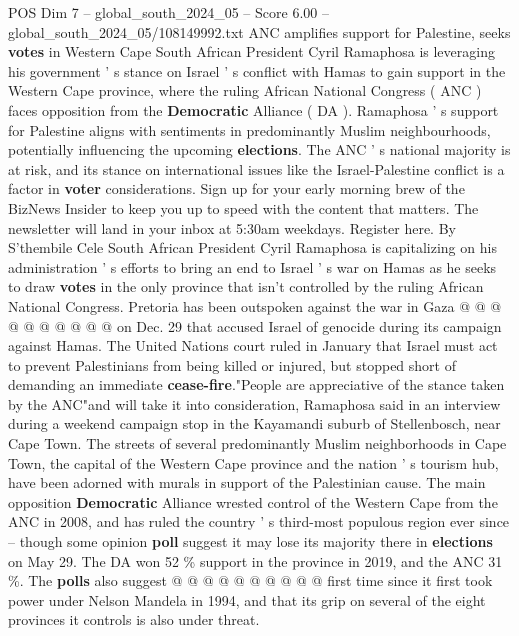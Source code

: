 \begin{textsample}{POS Dim 7 – global\_south\_2024\_05 – Score 6.00 – global\_south\_2024\_05/108149992.txt}  \label{ex:f7_pos_213}
ANC amplifies support for Palestine, seeks \textbf{votes} in Western Cape South African President Cyril Ramaphosa is leveraging his government ' s stance on Israel ' s conflict with Hamas to gain support in the Western Cape province, where the ruling African National Congress ( ANC ) faces opposition from the \textbf{Democratic} Alliance ( DA ).
Ramaphosa ' s support for Palestine aligns with sentiments in predominantly Muslim neighbourhoods, potentially influencing the upcoming \textbf{elections}.
The ANC ' s national majority is at risk, and its stance on international issues like the Israel-Palestine conflict is a factor in \textbf{voter} considerations.
Sign up for your early morning brew of the BizNews Insider to keep you up to speed with the content that matters.
The newsletter will land in your inbox at 5:30am weekdays.
Register here.
By S'thembile Cele South African President Cyril Ramaphosa is capitalizing on his administration ' s efforts to bring an end to Israel ' s war on Hamas as he seeks to draw \textbf{votes} in the only province that isn't controlled by the ruling African National Congress.
Pretoria has been outspoken against the war in Gaza @ @ @ @ @ @ @ @ @ @ on Dec. 29 that accused Israel of genocide during its campaign against Hamas.
The United Nations court ruled in January that Israel must act to prevent Palestinians from being killed or injured, but stopped short of demanding an immediate \textbf{cease-fire}."People are appreciative of the stance taken by the ANC"and will take it into consideration, Ramaphosa said in an interview during a weekend campaign stop in the Kayamandi suburb of Stellenbosch, near Cape Town.
The streets of several predominantly Muslim neighborhoods in Cape Town, the capital of the Western Cape province and the nation ' s tourism hub, have been adorned with murals in support of the Palestinian cause.
The main opposition \textbf{Democratic} Alliance wrested control of the Western Cape from the ANC in 2008, and has ruled the country ' s third-most populous region ever since -- though some opinion \textbf{poll} suggest it may lose its majority there in \textbf{elections} on May 29.
The DA won 52 \% support in the province in 2019, and the ANC 31 \%.
The \textbf{polls} also suggest @ @ @ @ @ @ @ @ @ @ first time since it first took power under Nelson Mandela in 1994, and that its grip on several of the eight provinces it controls is also under threat.

\end{textsample}
